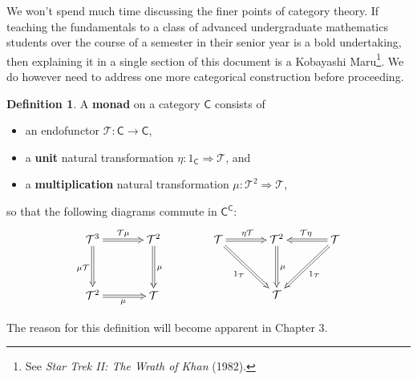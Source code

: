 \documentclass[MS, xcolor=dvipsnames]{wfuthesis}
\def\sC{\mathsf{C}}
\def\cT{\mathcal{T}}
\theoremstyle{definition}
\newtheorem{definition}[theorem]{Definition}
\begin{document}
We won't spend much time discussing the finer points of category theory. If teaching the fundamentals to a class of advanced undergraduate mathematics students over the course of a semester in their senior year is a bold undertaking, then explaining it in a single section of this document is a Kobayashi Maru\footnote{See \textit{Star Trek II: The Wrath of Khan} (1982).}. We do however need to address one more categorical construction before proceeding. 
\begin{definition}
  A \textbf{monad} on a category $\sC$ consists of 
  \begin{itemize}
    \item an endofunctor $\cT: \sC \to \sC$,
    \item a \textbf{unit} natural transformation $\eta: 1_\sC \Rightarrow \cT$, and 
    \item a \textbf{multiplication} natural transformation $\mu: \cT^2 \Rightarrow \cT$,
  \end{itemize}
  so that the following diagrams commute in $\sC^\sC$: 
\[ \SelectTips{cm}{}\xymatrix@R+1pc@C+1pc{
  \cT^3 \ar@{=>}[r]^{\cT\mu} \ar@{=>}[d]_{\mu \cT} & \cT^2 \ar@{=>}[d]^\mu \\ \cT^2 \ar@{=>}[r]_\mu & \cT
} \qquad\qquad \SelectTips{cm}{}\xymatrix@R+1pc@C+1pc{
  \cT \ar@{=>}[r]^{\eta \cT} \ar@{=>}[dr]_{1_\cT} & \cT^2 \ar@{=>}[d]^\mu & \cT \ar@{=>}[l]_{\cT\eta} \ar@{=>}[dl]^{1_\cT} \\ & \cT &
} \]
\end{definition}%
The reason for this definition will become apparent in Chapter 3. 
\end{document}
